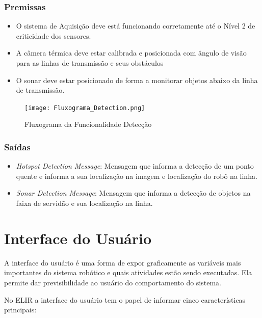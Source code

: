 \subsubsection{Premissas}
\begin{itemize}
	\item O sistema de Aquisição deve está funcionando corretamente até o Nível 2 de criticidade dos sensores.
	\item A câmera térmica deve estar calibrada e posicionada com ângulo de visão para as linhas de transmissão e seus obstáculos
	\item O sonar deve estar posicionado de forma a monitorar objetos abaixo da linha de transmissão.            
\end{itemize}

\begin{figure}[!ht]
	\centering
	\texttt{[image: Fluxograma\_Detection.png]}
	\caption{Fluxograma da Funcionalidade Detecção} \label{FuncDetec}
\end{figure}

\subsubsection{Saídas}

\begin{itemize}
	\item \textit{Hotspot Detection Message}: Mensagem que informa a detecção de um ponto quente e informa a sua localização na imagem e localização do robô na linha.
	\item \textit{Sonar Detection Message}: Mensagem que informa a detecção de objetos na faixa de servidão e sua localização na linha.
\end{itemize}


\section{Interface do Usuário}
\label{sec:ui}

A interface do usuário é uma forma de expor graficamente as variáveis mais importantes do sistema robótico e quais atividades estão sendo executadas. Ela permite dar previsibilidade ao usuário do comportamento do sistema. 

No ELIR a interface do usuário tem o papel de informar cinco características principais:

